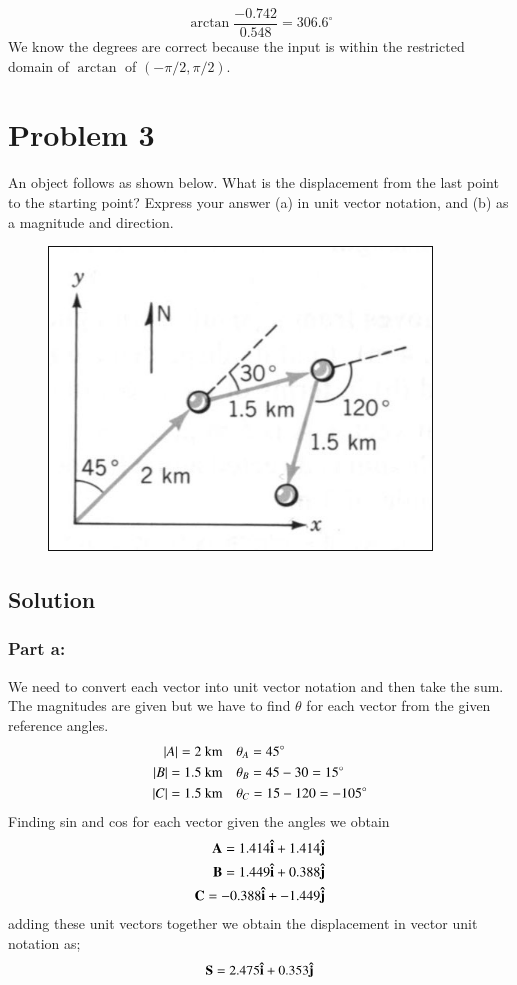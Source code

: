 \documentclass{article}
\begin{document}
\[
	\arctan \frac{-0.742}{0.548} = 306.6^\circ
\]
We know the degrees are correct because the input is within the restricted domain of $\arctan$ of $(-\pi/ 2, \pi/2)$.

\section*{Problem 3}
An object follows as shown below. What is the displacement from the last point to the
starting point? Express your answer (a) in unit vector notation, and (b) as a magnitude and
direction.

\begin{figure}[ht]
    \centering
    \includegraphics[scale=0.5]{graph-2.png}
\end{figure}

\subsection*{Solution}
\subsubsection*{Part a:}
We need to convert each vector into unit vector notation and then take the sum. The magnitudes are given but we have to find $\theta$ for each vector from the given reference angles.
\begin{align*}
	\vb |A| = 2\ \text{km} &\quad \theta_A = 45^\circ \\
	\vb |B| = 1.5\ \text{km} &\quad \theta_B = 45 - 30 = 15^\circ \\
	\vb |C| = 1.5\ \text{km} &\quad \theta_C = 15 - 120 = -105^\circ \\
\end{align*}
Finding sin and cos for each vector given the angles we obtain
\begin{align*}
	\vb A = 1.414 \vu i + 1.414 \vu j \\
	\vb B = 1.449 \vu i + 0.388 \vu j \\
	\vb C = -0.388 \vu i + -1.449 \vu j
\end{align*}
adding these unit vectors together we obtain the displacement in vector unit notation as;
\[
	\vb S = 2.475 \vu i + 0.353 \vu j
\]
\end{document}
